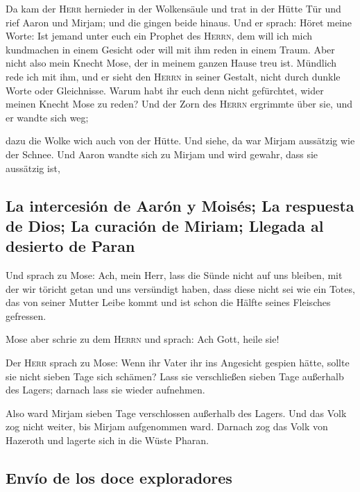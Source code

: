  Da kam der \textsc{Herr} hernieder in der Wolkensäule und
trat in der Hütte Tür und rief Aaron und Mirjam; und die gingen beide
hinaus.  Und er sprach: Höret meine Worte: Ist jemand
unter euch ein Prophet des \textsc{Herrn}, dem will ich mich kundmachen
in einem Gesicht oder will mit ihm reden in einem Traum. 
Aber nicht also mein Knecht Mose, der in meinem ganzen Hause treu ist.
 Mündlich rede ich mit ihm, und er sieht den
\textsc{Herrn} in seiner Gestalt, nicht durch dunkle Worte oder
Gleichnisse. Warum habt ihr euch denn nicht gefürchtet, wider meinen
Knecht Mose zu reden?  Und der Zorn des \textsc{Herrn}
ergrimmte über sie, und er wandte sich weg;

 dazu die Wolke wich auch von der Hütte. Und siehe, da
war Mirjam aussätzig wie der Schnee. Und Aaron wandte sich zu Mirjam und
wird gewahr, dass sie aussätzig ist,

\hypertarget{la-intercesiuxf3n-de-aaruxf3n-y-moisuxe9s-la-respuesta-de-dios-la-curaciuxf3n-de-miriam-llegada-al-desierto-de-paran}{%
\subsection{La intercesión de Aarón y Moisés; La respuesta de Dios; La
curación de Miriam; Llegada al desierto de
Paran}\label{la-intercesiuxf3n-de-aaruxf3n-y-moisuxe9s-la-respuesta-de-dios-la-curaciuxf3n-de-miriam-llegada-al-desierto-de-paran}}

 Und sprach zu Mose: Ach, mein Herr, lass die Sünde nicht
auf uns bleiben, mit der wir töricht getan und uns versündigt haben,
 dass diese nicht sei wie ein Totes, das von seiner
Mutter Leibe kommt und ist schon die Hälfte seines Fleisches gefressen.

 Mose aber schrie zu dem \textsc{Herrn} und sprach: Ach
Gott, heile sie!

 Der \textsc{Herr} sprach zu Mose: Wenn ihr Vater ihr ins
Angesicht gespien hätte, sollte sie nicht sieben Tage sich schämen? Lass
sie verschließen sieben Tage außerhalb des Lagers; darnach lass sie
wieder aufnehmen.

 Also ward Mirjam sieben Tage verschlossen außerhalb des
Lagers. Und das Volk zog nicht weiter, bis Mirjam aufgenommen ward.
 Darnach zog das Volk von Hazeroth und lagerte sich in
die Wüste Pharan.

\hypertarget{envuxedo-de-los-doce-exploradores}{%
\subsection{Envío de los doce
exploradores}\label{envuxedo-de-los-doce-exploradores}}

